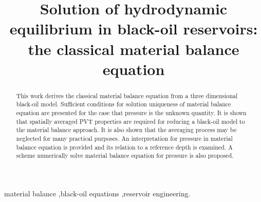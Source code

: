 \documentclass[final,authoryear,5p,times,twocolumn,10pt]{elsarticle}
\begin{document}
\begin{frontmatter}
\title{Solution of hydrodynamic equilibrium in black-oil reservoirs: the classical material balance equation}

%



\begin{abstract}
This work derives the classical material balance equation from a three dimensional black-oil model. Sufficient conditions for solution uniqueness of material balance equation are presented for the case that pressure is the unknown quantity. It is shown that spatially averaged PVT properties are required for reducing a black-oil model to the material balance approach. It is also shown that the averaging process may be neglected for many practical purposes.  An interpretation for pressure in material balance equation is provided and its relation to a reference depth is examined. A scheme numerically solve material balance equation for pressure is also proposed.
%
\end{abstract}

\begin{keyword}
material balance \sep black-oil equations \sep reservoir engineering.
\end{keyword}
\end{frontmatter}
\end{document}
